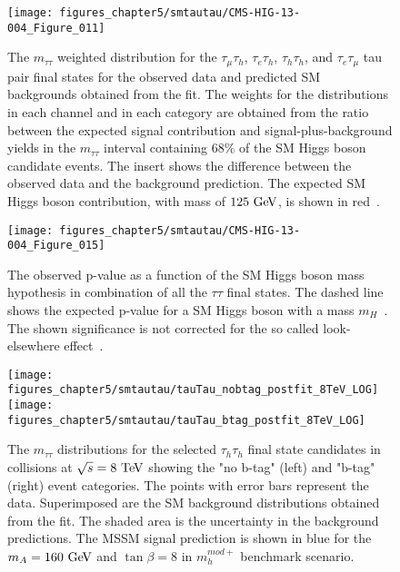 \begin{figure}[htbp]
\centering
\texttt{[image: figures\_chapter5/smtautau/CMS-HIG-13-004\_Figure\_011]}
\caption{The $m_{\tau\tau}$ weighted distribution for the $\tau_{\mu}\tau_{h}$, $\tau_{e}\tau_{h}$, $\tau_{h}\tau_{h}$, and  $\tau_{e}\tau_{\mu}$ tau pair final states for the observed data and predicted SM backgrounds obtained from the fit. The weights for the distributions in each channel and in each category are obtained from the ratio between the expected signal contribution and signal-plus-background yields in the $m_{\tau\tau}$ interval containing $68\%$ of the SM Higgs boson candidate events. The insert shows the difference between the observed data and the background prediction. The expected SM Higgs boson contribution, with mass of $125~\mathrm{Ge\kern -0.1em V}$, is shown in red~\cite{Chatrchyan:2014nva}.}
\label{fig:mass_plot}
\end{figure}


\begin{figure}[htbp]
\centering
\texttt{[image: figures\_chapter5/smtautau/CMS-HIG-13-004\_Figure\_015]}
\caption{The observed p-value as a function of the SM Higgs boson mass hypothesis in combination of all the $\tau\tau$ final states. The dashed line shows the expected p-value for a SM Higgs boson with a mass $m_{H}$~\cite{Chatrchyan:2014nva}. The shown significance is not corrected for the so called look-elsewhere effect~\cite{loook}.}
\label{fig:money}
\end{figure}

\begin{figure}[htbp]
\centering
\texttt{[image: figures\_chapter5/smtautau/tauTau\_nobtag\_postfit\_8TeV\_LOG]}
\texttt{[image: figures\_chapter5/smtautau/tauTau\_btag\_postfit\_8TeV\_LOG]}
\caption{The $m_{\tau\tau}$ distributions for the selected $\tau_{h}\tau_{h}$ final state candidates in collisions at $\sqrt{s}=8~\mathrm{Te\kern -0.1em V}$ showing the "no b-tag" (left) and "b-tag" (right) event categories. The points with error bars represent the data. Superimposed are the SM background distributions obtained from the fit. The shaded area is the uncertainty in the background predictions. The MSSM signal prediction is shown in blue for the $m_{A}=160~\mathrm{Ge\kern -0.1em V}$ and $\tan \beta=8$ in $m_{h}^{mod+}$ benchmark scenario.}
\label{fig:mssmtauhtauh}
\end{figure}

